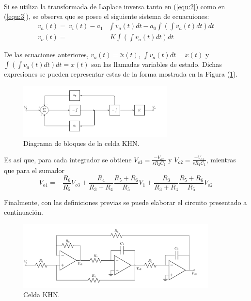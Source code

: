 Si se utiliza la transformada de Laplace inversa tanto en (\ref{equ:2}) como en (\ref{equ:3}), se observa que se posee el siguiente sistema de ecuacuiones:
\begin{equation}
\begin{split}
	v_a(t) =\ v_i(t) - a_1 & \int v_a(t)dt - a_0 \int \left( \int v_a(t)dt \right) dt \\
	v_o(t) =& \ K\int \left( \int v_a(t)dt \right) dt
\end{split}
\end{equation}

De las ecuaciones anteriores, $v_a(t) = \ddot{x}(t) $, $\int v_a(t)dt = \dot{x}(t)$ y $\int \left( \int v_a(t)dt \right) dt = x(t)$ son las llamadas variables de estado. Dichas expresiones se pueden representar estas de la forma mostrada en la Figura (\ref{fig:blockKHN}).
\begin{figure}[H]
\centering
	\includegraphics[width=0.7\textwidth]{ImagenesEjercicio4/Bloques-KHN.pdf}
	\caption{Diagrama de bloques de la celda KHN.}
	\label{fig:blockKHN}
\end{figure}

Es así que, para cada integrador se obtiene $V_{o3} = \frac{-V_{o2}}{sR_2C_2}$ y
$V_{o2} = \frac{-V_{o1}}{sR_1C_1}$, mientras que para el sumador
\begin{equation*}
	V_{o1} = -\frac{R_6}{R_5} V_{o3} + \frac{R_4}{R_3 + R_4} \frac{R_5 + R_6}{R_5} V_1 + \frac{R_3}{R_3 + R_4} \frac{R_5 + R_6}{R_5} V_{o2}
\end{equation*}

Finalmente, con las definiciones previas se puede elaborar el circuito presentado a continuación.
\begin{figure}[H]
\centering
	\includegraphics[width=0.9\textwidth]{ImagenesEjercicio4/KHN.pdf}
	\caption{Celda KHN.}
	\label{fig:KHN}
\end{figure}

